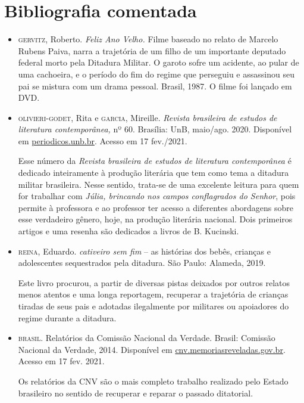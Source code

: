 \documentclass[12pt]{extarticle}
\begin{document}
\section{Bibliografia comentada}

\begin{itemize}

\item \textsc{gervitz}, Roberto. \emph{Feliz Ano Velho.} Filme baseado no relato de Marcelo Rubens Paiva, narra a trajetória de um filho de um importante deputado federal morto pela Ditadura Militar. O garoto sofre um acidente, ao pular de uma cachoeira, e o período do fim do regime que perseguiu e assassinou seu pai se mistura com um drama pessoal. Brasil, 1987. O filme foi lançado em DVD. 

\item \textsc{olivieri-godet}, Rita e \textsc{garcia}, Mireille. \emph{Revista brasileira de
estudos de literatura contemporânea,} nº 60. Brasília: UnB, maio/ago.
2020. Disponível em
\href{periodicos.unb.br/index.php/estudos/issue/view/1995}{periodicos.unb.br}.
Acesso em 17 fev./2021.

Esse número da \emph{Revista brasileira de estudos de literatura
contemporânea} é dedicado inteiramente à produção literária que tem como
tema a ditadura militar brasileira. Nesse sentido, trata-se de uma
excelente leitura para quem for trabalhar com \emph{Júlia, brincando nos
campos conflagrados do Senhor}, pois permite à professora e ao professor
ter acesso a diferentes abordagens sobre esse verdadeiro gênero, hoje,
na produção literária nacional. Dois primeiros artigos e uma resenha são
dedicados a livros de B. Kucinski.

\item \textsc{reina}, Eduardo. \emph{cativeiro sem fim} -- as histórias dos bebês,
crianças e adolescentes sequestrados pela ditadura. São Paulo: Alameda,
2019.

Este livro procurou, a partir de diversas pistas deixados por outros
relatos menos atentos e uma longa reportagem, recuperar a trajetória de
crianças tiradas de seus pais e adotadas ilegalmente por militares ou
apoiadores do regime durante a ditadura.

\item \textsc{brasil}. Relatórios da Comissão Nacional da Verdade. Brasil: Comissão
Nacional da Verdade, 2014. Disponível em
\href{http://cnv.memoriasreveladas.gov.br/}{{cnv.memoriasreveladas.gov.br}}.
Acesso em 17 fev. 2021.

Os relatórios da CNV são o mais completo trabalho realizado pelo Estado
brasileiro no sentido de recuperar e reparar o passado ditatorial.


\end{itemize}
\end{document}
